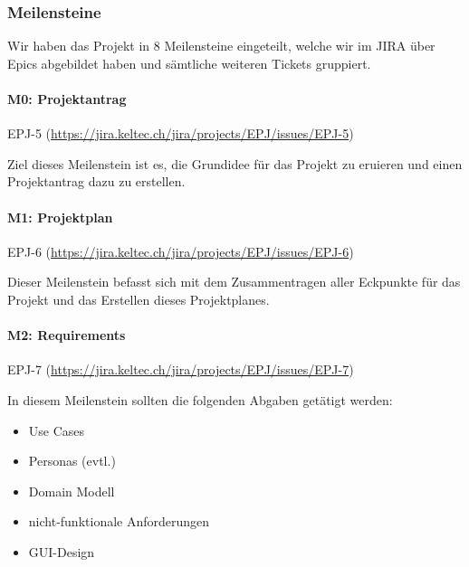 \documentclass[a4paper]{article}
\def\jiraurl{https://jira.keltec.ch/jira}
\newcommand{\fulljiraissue}[1]{EPJ-#1 (\url{\jiraurl/projects/EPJ/issues/EPJ-#1})}
\begin{document}
\subsubsection{Meilensteine}

Wir haben das Projekt in 8 Meilensteine eingeteilt, welche wir im JIRA über Epics abgebildet haben und sämtliche weiteren Tickets gruppiert.

\paragraph{M0: Projektantrag} \fulljiraissue{5}

Ziel dieses Meilenstein ist es, die Grundidee für das Projekt zu eruieren und einen Projektantrag dazu zu erstellen.

\paragraph{M1: Projektplan} \fulljiraissue{6}

Dieser Meilenstein befasst sich mit dem Zusammentragen aller Eckpunkte für das Projekt und das Erstellen dieses Projektplanes.

\paragraph{M2: Requirements} \fulljiraissue{7}


In diesem Meilenstein sollten die folgenden Abgaben getätigt werden:

\begin{itemize}
  \item Use Cases
  \item Personas (evtl.)
  \item Domain Modell
  \item nicht-funktionale Anforderungen
  \item GUI-Design
\end{itemize}
\end{document}

